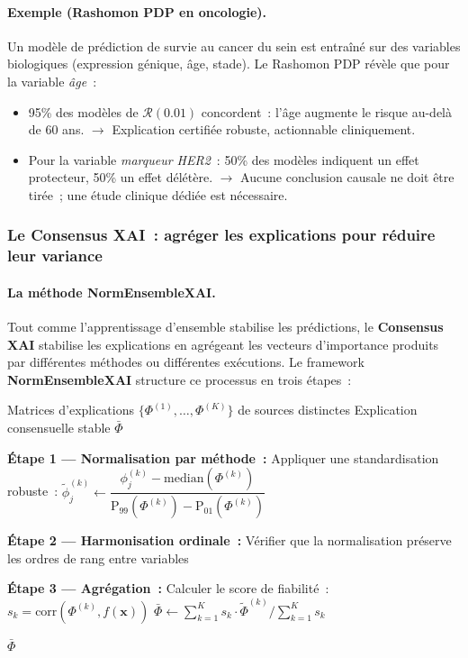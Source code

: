 \paragraph{Exemple (Rashomon PDP en oncologie).}
Un modèle de prédiction de survie au cancer du sein est entraîné sur des variables
biologiques (expression génique, âge, stade). Le Rashomon PDP révèle que pour
la variable \textit{âge}~:
\begin{itemize}
  \item 95\% des modèles de $\mathcal{R}(0.01)$ concordent~: l'âge augmente le risque
        au-delà de 60 ans. $\rightarrow$ Explication certifiée robuste, actionnable cliniquement.
  \item Pour la variable \textit{marqueur HER2}~: 50\% des modèles indiquent un effet
        protecteur, 50\% un effet délétère. $\rightarrow$ Aucune conclusion causale ne doit
        être tirée~; une étude clinique dédiée est nécessaire.
\end{itemize}

\subsubsection{Le Consensus XAI~: agréger les explications pour réduire leur variance}

\paragraph{La méthode NormEnsembleXAI.}

Tout comme l'apprentissage d'ensemble stabilise les prédictions, le
\textbf{Consensus XAI} stabilise les explications en agrégeant les vecteurs d'importance
produits par différentes méthodes ou différentes exécutions. Le framework
\textbf{NormEnsembleXAI} structure ce processus en trois étapes~:

\begin{algorithm}[H]
\caption{NormEnsembleXAI — agrégation d'explications plurielles}
\begin{algorithmic}[1]
\Require Matrices d'explications $\{\Phi^{(1)}, \ldots, \Phi^{(K)}\}$ de sources distinctes
\Ensure Explication consensuelle stable $\bar{\Phi}$

\State \textbf{Étape 1 — Normalisation par méthode~:}
    \State Appliquer une standardisation robuste~:
    \State $\tilde{\phi}^{(k)}_j \leftarrow \dfrac{\phi^{(k)}_j - \mathrm{median}(\Phi^{(k)})}
    {\mathrm{P}_{99}(\Phi^{(k)}) - \mathrm{P}_{01}(\Phi^{(k)})}$
\EndFor

\State \textbf{Étape 2 — Harmonisation ordinale~:}
\State Vérifier que la normalisation préserve les ordres de rang entre variables

\State \textbf{Étape 3 — Agrégation~:}
\State Calculer le score de fiabilité~: $s_k = \mathrm{corr}(\Phi^{(k)}, f(\mathbf{x}))$
\State $\bar{\Phi} \leftarrow \sum_{k=1}^{K} s_k \cdot \tilde{\Phi}^{(k)} \Big/ \sum_{k=1}^K s_k$

\State \Return $\bar{\Phi}$
\end{algorithmic}
\end{algorithm}

